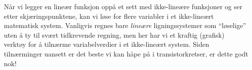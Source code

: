 Når vi legger en lineær funksjon oppå et sett med ikke-lineære funksjoner og ser etter skjæringspunktene, kan vi løse for flere variabler i et ikke-lineært matematisk system. Vanligvis regnes bare {\it lineære} ligningssystemer som ``løselige'' uten å ty til svært tidkrevende regning, men her har vi et kraftig (grafisk) verktøy for å tilnærme variabelverdier i et ikke-lineært system. Siden tilnærminger uansett er det beste vi kan håpe på i transistorkretser, er dette godt nok!











